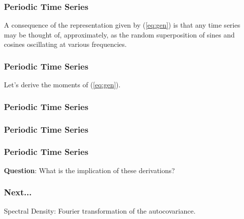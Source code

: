 \documentclass[%
xcolor=pdftex]{beamer}
\begin{document}
\begin{frame}
\frametitle{Periodic Time Series}

A consequence of the representation given by (\ref{eq:gen}) is that any \underline{\hspace{17 mm}} time series may be thought of, approximately, as the random superposition of sines and cosines oscillating at various frequencies.

\end{frame}

\begin{frame}
\frametitle{Periodic Time Series}

Let's derive the moments of (\ref{eq:gen}).

\vspace{50mm}

\end{frame}

\begin{frame}
\frametitle{Periodic Time Series}



\end{frame}

\begin{frame}
\frametitle{Periodic Time Series}



\end{frame}

\begin{frame}
\frametitle{Periodic Time Series}

\textbf{Question}: What is the implication of these derivations?

\vspace{50mm}

\end{frame}

\begin{frame}
\frametitle{Next...}

Spectral Density: Fourier transformation of the autocovariance.


\end{frame}
\end{document}
